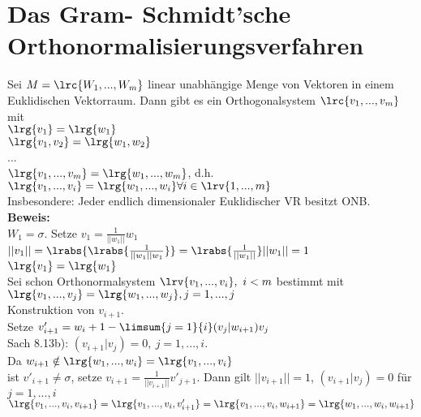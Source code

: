 \section{Das Gram- Schmidt'sche Orthonormalisierungsverfahren}
	Sei $ M=\lrc{W_1,...,W_m} $ linear unabhängige Menge von Vektoren in einem Euklidischen Vektorraum. Dann gibt es ein Orthogonalsystem $ \lrc{v_1,...,v_m} $ mit\\
	$ \lrg{v_1}=\lrg{w_1} $\\
	$ \lrg{v_1,v_2}=\lrg{w_1,w_2} $\\
	...\\
	$ \lrg{v_1,...,v_m}=\lrg{w_1,...,w_m} $, d.h.\\
	$ \lrg{v_1,...,v_i}=\lrg{w_1,...,w_i}\forall i\in\lrv{1,...,m} $\\
	Insbesondere: Jeder endlich dimensionaler Euklidischer VR besitzt ONB.\\
	\textbf{Beweis:}\\
	$ W_1=\sigma $. Setze $ v_1=\frac{1}{||w_1||}w_1 $\\
	$ ||v_1||=\lrabs{\lrabs{\frac{1}{||w_1||w_1}}}=\lrabs{\frac{1}{||w_1||}}||w_1||=1 $\\
	$ \lrg{v_1}=\lrg{w_1} $\\
	Sei schon Orthonormalsystem $ \lrv{v_1,...,v_i},\ i<m $ bestimmt mit $ \lrg{v_1,...,v_j}=\lrg{w_1,...,w_j},j=1,...,j $\\
	Konstruktion von $ v_{i+1} $.\\
	Setze $ v'_{i+1}=w_i+1-\limsum{j=1}{i}(v_j|w_{i+1})v_j $\\
	Sach 8.13b): $ (v_{i+1}|v_j)=0,\ j=1,...,i $.\\
	Da $ w_{i+1}\notin\lrg{w_1,...,w_i}=\lrg{v_1,...,v_i} $\\
	ist $ v'_{i+1}\neq\sigma $, setze $ v_{i+1}=\frac{1}{||v_{i+1}||}v'_{j+1} $. Dann gilt $ ||v_{i+1}||=1 $, $ (v_{i+1}|v_j)=0 $ für $ j=1,...,i $\\
	$ \lrg{v_1,...,v_i,v_{i+1}}=\lrg{v_1,...,v_i,v'_{i+1}}=\lrg{v_1,...,v_i,w_{i+1}}=\lrg{w_1,...,w_i,w_{i+1}} $

